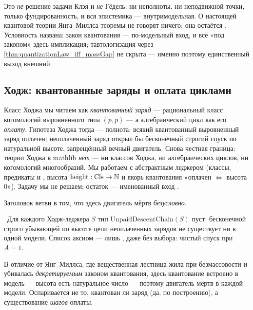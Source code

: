 \begin{remark}
Это \emph{не} решение задачи Клэя и \emph{не} Гёдель: ни неполноты, ни неподвижной точки, только
фундированность, и вся эпистемика --- внутримодельная. О настоящей квантовой теории Янга--Миллса
теоремы не говорят ничего; она остаётся \red{}. Условность названа: закон квантования --- \red{}
по-модельный вход, и всё «под законом» здесь импликация; тавтологизация через
\cref{thm:quantizationLaw_iff_massGap} не скрыта --- именно поэтому единственный выход внешний.
\end{remark}

\subsection{Ходж: квантованные заряды и оплата циклами}

Класс Ходжа мы читаем как \emph{квантованный заряд} --- рациональный класс когомологий выровненного
типа $(p,p)$ --- а алгебраический цикл как его \emph{оплату}. Гипотеза Ходжа тогда --- полнота: всякий
квантованный выровненный заряд оплачен; неоплаченный заряд открыл бы бесконечный строгий спуск по
натуральной высоте, запрещённый вечный двигатель. Снова честная граница: теории Ходжа в mathlib
\emph{нет} --- ни классов Ходжа, ни алгебраических циклов, ни когомологий многообразий. Мы работаем с
абстрактным леджером  (классы, предикаты  и , высота
$\mathrm{height}:\mathrm{Cls}\to\mathbb{N}$ и якорь квантования «оплачен $\iff$ высота $0$»). Задачу мы не
решаем; остаток --- именованный вход .

Заголовок ветви в том, что здесь двигатель мёртв \emph{безусловно}.

\begin{theorem}\label{thm:isEmpty_unpaidDescentChain}
\green{}\ Для каждого Ходж-леджера $S$ тип $\mathrm{UnpaidDescentChain}(S)$ пуст: бесконечной строго
убывающей по высоте цепи неоплаченных зарядов не существует ни в одной модели. Список аксиом --- лишь
, даже без выбора: чистый спуск при $A=1$.
\end{theorem}

В отличие от Янг--Миллса, где вещественная лестница жила при безмассовости и убивалась
\emph{декретируемым} законом квантования, здесь квантование встроено в модель --- высота есть
натуральное число --- поэтому двигатель мёртв в каждой модели. Оспаривается не то, квантован ли заряд
(да, по построению), а существование \emph{шагов} оплаты.

